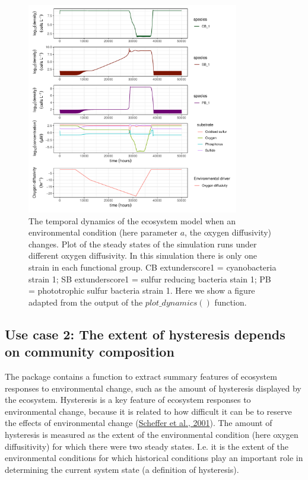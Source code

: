 \documentclass[
]{article}
\begin{document}
\begin{figure}

{\centering \includegraphics[width=350px]{figures/gen_uc1_partrep_temporal_state_switching} 

}

\caption{The temporal dynamics of the ecosystem model when an environmental condition (here parameter $a$, the oxygen diffusivity) changes. Plot of the steady states of the simulation runs under different oxygen diffusivity. In this simulation there is only one strain in each functional group. CB   extunderscore1 = cyanobacteria strain 1; SB extunderscore1 = sulfur reducing bacteria stain 1; PB = phototrophic sulfur bacteria strain 1. Here we show a figure adapted from the output of the $plot\_dynamics()$  function.}\label{fig:uc1}
\end{figure}

\hypertarget{use-case-2-the-extent-of-hysteresis-depends-on-community-composition}{%
\subsection{Use case 2: The extent of hysteresis depends on community composition}\label{use-case-2-the-extent-of-hysteresis-depends-on-community-composition}}

The package contains a function to extract summary features of ecosystem responses to environmental change, such as the amount of hysteresis displayed by the ecosystem. Hysteresis is a key feature of ecosystem responses to environmental change, because it is related to how difficult it can be to reserve the effects of environmental change (\protect\hyperlink{ref-Scheffer2001}{Scheffer et al., 2001}). The amount of hysteresis is measured as the extent of the environmental condition (here oxygen diffusitivity) for which there were two steady states. I.e. it is the extent of the environmental conditions for which historical conditions play an important role in determining the current system state (a definition of hysteresis).
\end{document}
